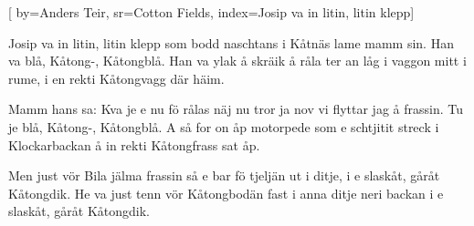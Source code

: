 

[ 		%
	by={Anders Teir},					%
	sr={Cotton Fields},					%
	index={Josip va in litin, litin klepp}]						%
	

\beginverse*						%
Josip va in litin, litin klepp som bodd
naschtans i Kåtnäs lame mamm sin.
Han va blå, Kåtong-, Kåtongblå.
Han va ylak å skräik å råla ter an låg
i vaggon mitt i rume,
i en rekti Kåtongvagg där häim.
\endverse							%

\beginverse*						%
Mamm hans sa: Kva je e nu fö rålas
näj nu tror ja nov vi flyttar jag å frassin.
Tu je blå, Kåtong-, Kåtongblå.
A så for on åp motorpede som e schtjitit
streck i Klockarbackan
å in rekti Kåtongfrass sat åp.
\endverse							%

\beginverse*						%
Men just vör Bila jälma frassin
så e bar fö tjeljän ut i ditje,
i e slaskåt, gåråt Kåtongdik.
He va just tenn vör Kåtongbodän
fast i anna ditje neri backan
i e slaskåt, gåråt Kåtongdik.
\endverse							%
\endsong							%
